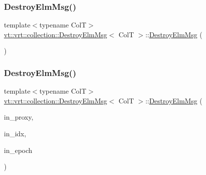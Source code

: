 \subsubsection{\texorpdfstring{Destroy\+Elm\+Msg()}{DestroyElmMsg()}\hspace{0.1cm}{\footnotesize\ttfamily [1/2]}}
{\footnotesize\ttfamily template$<$typename ColT$>$ \\
\hyperlink{structvt_1_1vrt_1_1collection_1_1_destroy_elm_msg}{vt\+::vrt\+::collection\+::\+Destroy\+Elm\+Msg}$<$ ColT $>$\+::\hyperlink{structvt_1_1vrt_1_1collection_1_1_destroy_elm_msg}{Destroy\+Elm\+Msg} (\begin{DoxyParamCaption}{ }\end{DoxyParamCaption})\hspace{0.3cm}{\ttfamily [default]}}

\mbox{\label{structvt_1_1vrt_1_1collection_1_1_destroy_elm_msg_a837873a189d4267f599ec975d2cde6f2}} 
\subsubsection{\texorpdfstring{Destroy\+Elm\+Msg()}{DestroyElmMsg()}\hspace{0.1cm}{\footnotesize\ttfamily [2/2]}}
{\footnotesize\ttfamily template$<$typename ColT$>$ \\
\hyperlink{structvt_1_1vrt_1_1collection_1_1_destroy_elm_msg}{vt\+::vrt\+::collection\+::\+Destroy\+Elm\+Msg}$<$ ColT $>$\+::\hyperlink{structvt_1_1vrt_1_1collection_1_1_destroy_elm_msg}{Destroy\+Elm\+Msg} (\begin{DoxyParamCaption}\item[{\hyperlink{namespacevt_a1b417dd5d684f045bb58a0ede70045ac}{Virtual\+Proxy\+Type}}]{in\+\_\+proxy,  }\item[{typename Col\+T\+::\+Index\+Type}]{in\+\_\+idx,  }\item[{\hyperlink{namespacevt_a985a5adf291c34a3ca263b3378388236}{Epoch\+Type}}]{in\+\_\+epoch }\end{DoxyParamCaption})\hspace{0.3cm}{\ttfamily [inline]}}



